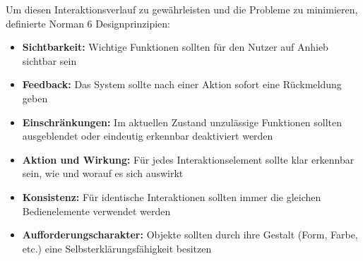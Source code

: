 Um diesen Interaktionsverlauf zu gewährleisten und die Probleme zu minimieren, definierte Norman 6 Designprinzipien:
\begin{itemize}
	\item \textbf{Sichtbarkeit:} Wichtige Funktionen sollten für den Nutzer auf Anhieb sichtbar sein
	\item \textbf{Feedback:} Das System sollte nach einer Aktion sofort eine Rückmeldung geben
	\item \textbf{Einschränkungen:} Im aktuellen Zustand unzulässige Funktionen sollten ausgeblendet oder eindeutig erkennbar deaktiviert werden
	\item \textbf{Aktion und Wirkung:} Für jedes Interaktionselement sollte klar erkennbar sein, wie und worauf es sich auswirkt
	\item \textbf{Konsistenz:} Für identische Interaktionen sollten immer die gleichen Bedienelemente verwendet werden
	\item \textbf{Aufforderungscharakter:} Objekte sollten durch ihre Gestalt (Form, Farbe, etc.) eine Selbsterklärungsfähigkeit besitzen \cite{Ullenboom2014}
\end{itemize}
